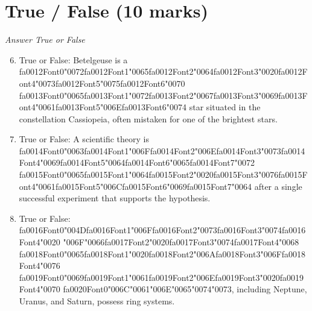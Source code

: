 \documentclass[12pt]{article}
\begin{document}
\section*{True / False (10 marks)}
\textit{Answer True or False}
\begin{enumerate}[label=\arabic*.]
\setcounter{enumi}{5}
\item True or False: Betelgeuse is a {\csname fa0012Font0\endcsname\char"0072}{\csname fa0012Font1\endcsname\char"0065}{\csname fa0012Font2\endcsname\char"0064}{\csname fa0012Font3\endcsname\char"0020}{\csname fa0012Font4\endcsname\char"0073}{\csname fa0012Font5\endcsname\char"0075}{\csname fa0012Font6\endcsname\char"0070} {\csname fa0013Font0\endcsname\char"0065}{\csname fa0013Font1\endcsname\char"0072}{\csname fa0013Font2\endcsname\char"0067}{\csname fa0013Font3\endcsname\char"0069}{\csname fa0013Font4\endcsname\char"0061}{\csname fa0013Font5\endcsname\char"006E}{\csname fa0013Font6\endcsname\char"0074} star situated in the constellation Cassiopeia, often mistaken for one of the brightest stars.
\item True or False: A scientific theory is {\csname fa0014Font0\endcsname\char"0063}{\csname fa0014Font1\endcsname\char"006F}{\csname fa0014Font2\endcsname\char"006E}{\csname fa0014Font3\endcsname\char"0073}{\csname fa0014Font4\endcsname\char"0069}{\csname fa0014Font5\endcsname\char"0064}{\csname fa0014Font6\endcsname\char"0065}{\csname fa0014Font7\endcsname\char"0072} {\csname fa0015Font0\endcsname\char"0065}{\csname fa0015Font1\endcsname\char"0064}{\csname fa0015Font2\endcsname\char"0020}{\csname fa0015Font3\endcsname\char"0076}{\csname fa0015Font4\endcsname\char"0061}{\csname fa0015Font5\endcsname\char"006C}{\csname fa0015Font6\endcsname\char"0069}{\csname fa0015Font7\endcsname\char"0064} after a single successful experiment that supports the hypothesis.
\item True or False: {\csname fa0016Font0\endcsname\char"004D}{\csname fa0016Font1\endcsname\char"006F}{\csname fa0016Font2\endcsname\char"0073}{\csname fa0016Font3\endcsname\char"0074}{\csname fa0016Font4\endcsname\char"0020} {\char"006F}{\char"0066}{\csname fa0017Font2\endcsname\char"0020}{\csname fa0017Font3\endcsname\char"0074}{\csname fa0017Font4\endcsname\char"0068} {\csname fa0018Font0\endcsname\char"0065}{\csname fa0018Font1\endcsname\char"0020}{\csname fa0018Font2\endcsname\char"006A}{\csname fa0018Font3\endcsname\char"006F}{\csname fa0018Font4\endcsname\char"0076} {\csname fa0019Font0\endcsname\char"0069}{\csname fa0019Font1\endcsname\char"0061}{\csname fa0019Font2\endcsname\char"006E}{\csname fa0019Font3\endcsname\char"0020}{\csname fa0019Font4\endcsname\char"0070} {\csname fa0020Font0\endcsname\char"006C}{\char"0061}{\char"006E}{\char"0065}{\char"0074}{\char"0073}, including Neptune, Uranus, and Saturn, possess ring systems.

\end{enumerate}
\end{document}
